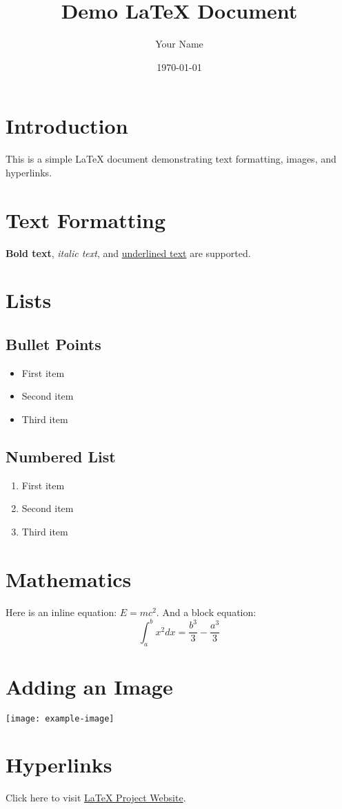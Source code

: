 \documentclass[10pt, letterpaper]{article}
\title{\textbf{Demo LaTeX Document}}
\author{Your Name}
\date{\today}
\begin{document}
\maketitle

\section{Introduction}
This is a simple LaTeX document demonstrating text formatting, images, and hyperlinks.

\section{Text Formatting}
\textbf{Bold text}, \textit{italic text}, and \underline{underlined text} are supported.

\section{Lists}
\subsection{Bullet Points}
\begin{itemize}
    \item First item
    \item Second item
    \item Third item
\end{itemize}

\subsection{Numbered List}
\begin{enumerate}
    \item First item
    \item Second item
    \item Third item
\end{enumerate}

\section{Mathematics}
Here is an inline equation: \( E = mc^2 \).  
And a block equation:
\[
\int_a^b x^2 dx = \frac{b^3}{3} - \frac{a^3}{3}
\]

\section{Adding an Image}
\begin{center}
    \texttt{[image: example-image]} %
\end{center}

\section{Hyperlinks}
Click here to visit \href{https://www.latex-project.org/}{LaTeX Project Website}.
\end{document}
